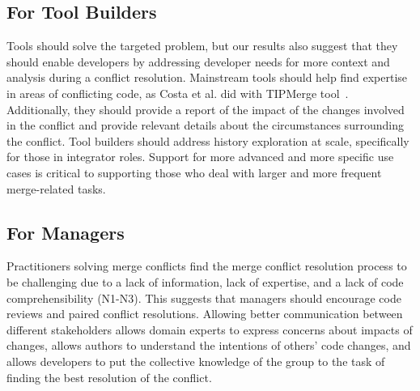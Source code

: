  

\subsection{For Tool Builders}
Tools should solve the targeted problem, but our results also suggest that they should enable developers by addressing developer needs for more context and analysis during a conflict resolution. Mainstream tools should help find expertise in areas of conflicting code, as Costa et al. did with TIPMerge tool~\cite{CostaSarma}. Additionally, they should provide a report of the impact of the changes involved in the conflict and provide relevant details about the circumstances surrounding the conflict.
Tool builders should address history exploration at scale, specifically for those in integrator roles. Support for more advanced and more specific use cases is critical to supporting those who deal with larger and more frequent merge-related tasks.

\subsection{For Managers}
Practitioners solving merge conflicts find the merge conflict resolution process to be challenging due to a lack of information, lack of expertise, and a lack of code comprehensibility (N1-N3). This suggests that managers should encourage code reviews and paired conflict resolutions. Allowing better communication between different stakeholders allows domain experts to express concerns about impacts of changes, allows authors to understand the intentions of others' code changes, and allows developers to put the collective knowledge of the group to the task of finding the best resolution of the conflict.